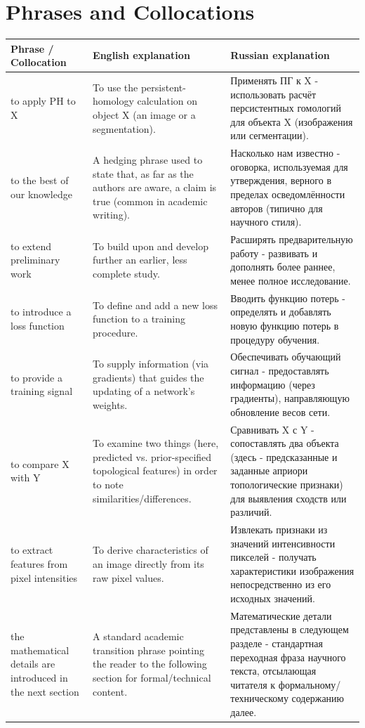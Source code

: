 \documentclass[12pt,a4paper]{article}
\begin{document}
\section*{Phrases and Collocations}

\begin{longtable}{p{4.3cm}p{5cm}p{5.9cm}}
\textbf{Phrase / Collocation} & \textbf{English explanation} & \textbf{Russian explanation} \\
\hline
\endhead
to apply PH to X &
To use the persistent-homology calculation on object X (an image or
a segmentation). &
Применять ПГ к X - использовать расчёт персистентных гомологий
для объекта X (изображения или сегментации). \\

to the best of our knowledge &
A hedging phrase used to state that, as far as the authors are
aware, a claim is true (common in academic writing). &
Насколько нам известно - оговорка, используемая для утверждения,
верного в пределах осведомлённости авторов (типично для научного
стиля). \\

to extend preliminary work &
To build upon and develop further an earlier, less complete study. &
Расширять предварительную работу - развивать и дополнять более
раннее, менее полное исследование. \\

to introduce a loss function &
To define and add a new loss function to a training procedure. &
Вводить функцию потерь - определять и добавлять новую функцию
потерь в процедуру обучения. \\

to provide a training signal &
To supply information (via gradients) that guides the updating of a
network's weights. &
Обеспечивать обучающий сигнал - предоставлять информацию (через
градиенты), направляющую обновление весов сети. \\

to compare X with Y &
To examine two things (here, predicted vs. prior-specified
topological features) in order to note similarities/differences. &
Сравнивать X с Y - сопоставлять два объекта (здесь - предсказанные
и заданные априори топологические признаки) для выявления сходств
или различий. \\

to extract features from pixel intensities &
To derive characteristics of an image directly from its raw pixel
values. &
Извлекать признаки из значений интенсивности пикселей - получать
характеристики изображения непосредственно из его исходных
значений. \\

the mathematical details are introduced in the next section &
A standard academic transition phrase pointing the reader to the
following section for formal/technical content. &
Математические детали представлены в следующем разделе -
стандартная переходная фраза научного текста, отсылающая читателя к
формальному/техническому содержанию далее. \\
\end{longtable}
\end{document}
